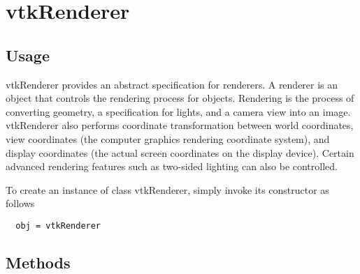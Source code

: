 \section{vtkRenderer}

\subsection{Usage}

 vtkRenderer provides an abstract specification for renderers. A renderer
 is an object that controls the rendering process for objects. Rendering
 is the process of converting geometry, a specification for lights, and
 a camera view into an image. vtkRenderer also performs coordinate
 transformation between world coordinates, view coordinates (the computer
 graphics rendering coordinate system), and display coordinates (the
 actual screen coordinates on the display device). Certain advanced
 rendering features such as two-sided lighting can also be controlled.

To create an instance of class vtkRenderer, simply
invoke its constructor as follows
\begin{verbatim}
  obj = vtkRenderer
\end{verbatim}
\subsection{Methods}

